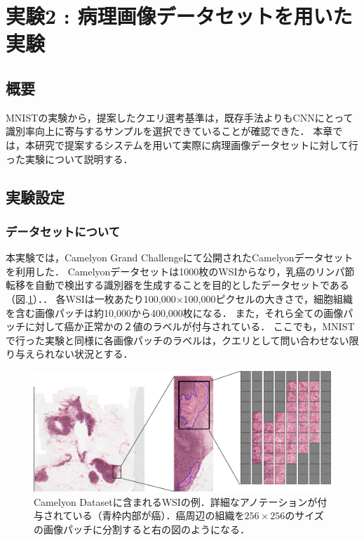\section{実験2 : 病理画像データセットを用いた実験}
\subsection{概要}
MNISTの実験から，提案したクエリ選考基準は，既存手法よりもCNNにとって識別率向上に寄与するサンプルを選択できていることが確認できた．
本章では，本研究で提案するシステムを用いて実際に病理画像データセットに対して行った実験について説明する．

\subsection{実験設定}
\subsubsection{データセットについて}
本実験では，Camelyon Grand Challenge\cite{Camelyon17}にて公開されたCamelyonデータセットを利用した．
Camelyonデータセットは1000枚のWSIからなり，乳癌のリンパ節転移を自動で検出する識別器を生成することを目的としたデータセットである（図.\ref{fig:camelyon}）．．
各WSIは一枚あたり100,000×100,000ピクセルの大きさで，細胞組織を含む画像パッチは約10,000から400,000枚になる．
また，それら全ての画像パッチに対して癌か正常かの２値のラベルが付与されている．
ここでも，MNISTで行った実験と同様に各画像パッチのラベルは，クエリとして問い合わせない限り与えられない状況とする．

\begin{figure}[h]
  \begin{center}
   \includegraphics[width=12cm]{figures/camelyon.pdf}
  \end{center}
 \caption{\label{fig:camelyon}Camelyon Datasetに含まれるWSIの例．詳細なアノテーションが付与されている（青枠内部が癌）．癌周辺の組織を$256 \times 256$のサイズの画像パッチに分割すると右の図のようになる．}
\end{figure}

